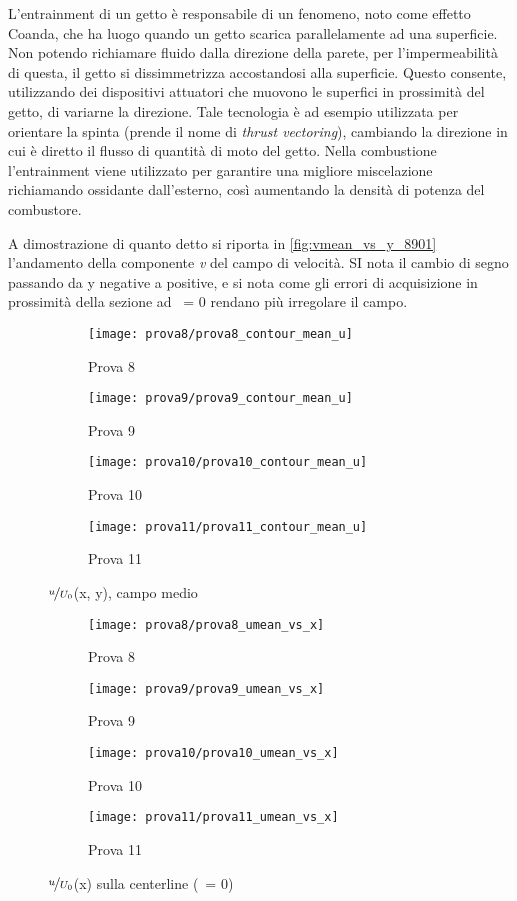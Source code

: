\documentclass{article} %
\newcommand{\xd}{\nicefrac{\textrm{x}}{\textrm{D}}\ }
\newcommand{\yd}{\nicefrac{\textrm{y}}{\textrm{D}}\ }
\begin{document}
L’entrainment di un getto è responsabile di un fenomeno, noto come effetto Coanda, che ha luogo quando un getto scarica parallelamente ad una superficie. Non potendo richiamare fluido dalla direzione della parete, per l’impermeabilità di questa, il getto si dissimmetrizza accostandosi alla superficie. Questo consente, utilizzando dei dispositivi attuatori che muovono le superfici in prossimità del getto, di variarne la direzione. Tale tecnologia è ad esempio utilizzata per orientare la spinta (prende il nome di \textit{thrust vectoring}), cambiando la direzione in cui è diretto il flusso di quantità di moto del getto. Nella combustione l'entrainment viene utilizzato per garantire una migliore miscelazione richiamando ossidante dall'esterno, così aumentando la densità di potenza del combustore.\par
A dimostrazione di quanto detto si riporta in \cref{fig:vmean_vs_y_8901} l'andamento della componente \textit{v} del campo di velocità. SI nota il cambio di segno passando da y negative a positive, e si nota come gli errori di acquisizione in prossimità della sezione ad \xd = 0 rendano più irregolare il campo. 
\clearpage
\begin{figure}[h!]
	\centering
	\begin{subfigure}{0.24\textwidth}
		\texttt{[image: prova8/prova8\_contour\_mean\_u]}
		\caption{Prova 8}
	\end{subfigure}
	\begin{subfigure}{0.24\textwidth}
		\texttt{[image: prova9/prova9\_contour\_mean\_u]}
		\caption{Prova 9}
	\end{subfigure}
	\begin{subfigure}{0.24\textwidth}
		\texttt{[image: prova10/prova10\_contour\_mean\_u]}
		\caption{Prova 10}
	\end{subfigure}
	\begin{subfigure}{0.24\textwidth}
		\texttt{[image: prova11/prova11\_contour\_mean\_u]}
		\caption{Prova 11}
	\end{subfigure}
	\caption{$\nicefrac{u}{U_0}$(x, y), campo medio}
	\label{fig:u_mean_8901}
\end{figure}
\begin{figure}[h!]
	\centering
	\begin{subfigure}[b]{0.24\textwidth}
		\texttt{[image: prova8/prova8\_umean\_vs\_x]}
		\caption{Prova 8}
	\end{subfigure}
	\begin{subfigure}[b]{0.24\textwidth}
		\texttt{[image: prova9/prova9\_umean\_vs\_x]}
		\caption{Prova 9}
	\end{subfigure}
	\begin{subfigure}[b]{0.24\textwidth}
		\texttt{[image: prova10/prova10\_umean\_vs\_x]}
		\caption{Prova 10}
	\end{subfigure}
	\begin{subfigure}[b]{0.24\textwidth}
		\texttt{[image: prova11/prova11\_umean\_vs\_x]}
		\caption{Prova 11}
	\end{subfigure}
	\caption{$\nicefrac{u}{U_0}$(x) sulla centerline (\yd = 0)}
	\label{fig:umean_vs_x_8901}
\end{figure}
\end{document}
